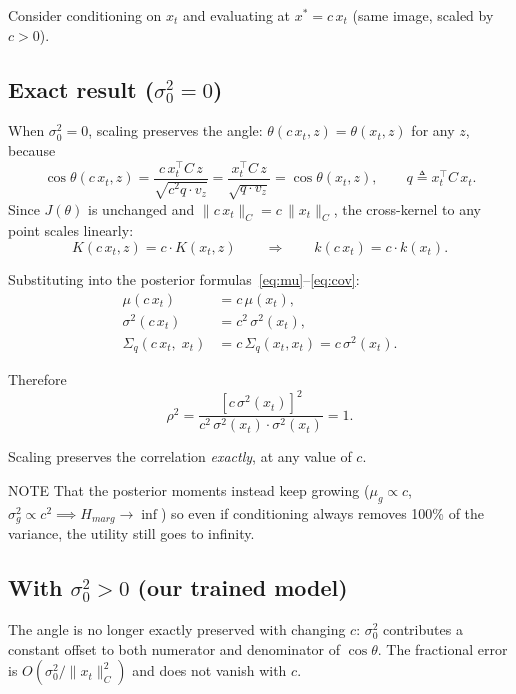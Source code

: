\documentclass[11pt]{article}
\begin{document}
Consider conditioning on $x_t$ and evaluating at $x^* = c\,x_t$
(same image, scaled by $c > 0$).

\subsection*{Exact result ($\sigma_0^2 = 0$)}

When $\sigma_0^2 = 0$, scaling preserves the angle: $\theta(c\,x_t, z) = \theta(x_t, z)$
for any $z$, because
\[
    \cos\theta(c\,x_t, z)
    = \frac{c\,x_t^\top C\, z}{\sqrt{c^2 q \cdot v_z}}
    = \frac{x_t^\top C\, z}{\sqrt{q \cdot v_z}}
    = \cos\theta(x_t, z),
    \qquad q \triangleq x_t^\top C\, x_t.
\]
Since $J(\theta)$ is unchanged and $\|c\,x_t\|_C = c\,\|x_t\|_C$,
the cross-kernel to any point scales linearly:
\begin{equation}
    K(c\,x_t, z) = c \cdot K(x_t, z)
    \qquad\Longrightarrow\qquad
    k(c\,x_t) = c \cdot k(x_t).
\end{equation}

Substituting into the posterior formulas~\eqref{eq:mu}--\eqref{eq:cov}:
\begin{align}
    \mu(c\,x_t) &= c\,\mu(x_t), \\
    \sigma^2(c\,x_t) &= c^2\,\sigma^2(x_t), \\
    \Sigma_q(c\,x_t,\; x_t) &= c\,\Sigma_q(x_t, x_t) = c\,\sigma^2(x_t).
\end{align}

Therefore
\begin{equation}
    \rho^2 = \frac{[c\,\sigma^2(x_t)]^2}{c^2\,\sigma^2(x_t) \cdot \sigma^2(x_t)} = 1.
\end{equation}

Scaling preserves the correlation \emph{exactly}, at any value of $c$. 

NOTE That the posterior moments
instead keep growing ($\mu_g \propto c$, $\sigma^2_g \propto c^2 \implies H_{marg} \to \inf$) so even if conditioning
always removes 100\% of the variance, the utility still goes to infinity.

\subsection*{With $\sigma_0^2 > 0$ (our trained model)}


The angle is no longer exactly preserved with changing $c$: $\sigma_0^2$ contributes
a constant offset to both numerator and denominator of $\cos\theta$.
The fractional error is $O(\sigma_0^2 / \|x_t\|_C^2)$ and does not
vanish with $c$.
\end{document}
